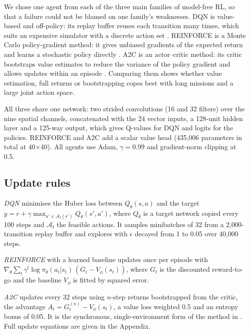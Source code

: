 We chose one agent from each of the three main families of model-free RL, so that a failure
could not be blamed on one family's weaknesses. DQN is value-based and off-policy: its replay
buffer reuses each transition many times, which suits an expensive simulator with a discrete
action set \cite{mnih2015}. REINFORCE is a Monte Carlo policy-gradient method: it gives
unbiased gradients of the expected return and learns a stochastic policy directly
\cite{williams1992}. A2C is an actor--critic method: its critic bootstraps value estimates to
reduce the variance of the policy gradient and allows updates within an episode
\cite{mnih2016}. Comparing them shows whether value estimation, full returns or bootstrapping
copes best with long missions and a large joint action space.

All three share one network: two strided convolutions (16 and 32 filters) over the nine
spatial channels, concatenated with the 24 vector inputs, a 128-unit hidden layer and a
125-way output, which gives Q-values for DQN and logits for the policies. REINFORCE and A2C
add a scalar value head (435{,}006 parameters in total at 40$\times$40). All agents use Adam,
$\gamma = 0.99$ and gradient-norm clipping at 0.5.

\subsection{Update rules}

\emph{DQN} minimises the Huber loss between $Q_\theta(s,a)$ and the target
$y = r + \gamma \max_{a' \in \mathcal{A}_{\mathrm{f}}(s')} Q_{\bar\theta}(s', a')$, where
$Q_{\bar\theta}$ is a target network copied every 100 steps and $\mathcal{A}_{\mathrm{f}}$ the
feasible actions. It samples minibatches of 32 from a 2{,}000-transition replay buffer and
explores with $\epsilon$ decayed from 1 to 0.05 over 40{,}000 steps.

\emph{REINFORCE} with a learned baseline updates once per episode with
$\nabla_\theta \sum_t \gamma^t \log \pi_\theta(a_t|s_t)\,(G_t - V_\phi(s_t))$, where $G_t$ is
the discounted reward-to-go and the baseline $V_\phi$ is fitted by squared error.

\emph{A2C} updates every 32 steps using $n$-step returns bootstrapped from the critic,
the advantage $A_t = G^{(n)}_t - V_\phi(s_t)$, a value loss weighted 0.5 and an entropy bonus
of 0.05. It is the synchronous, single-environment form of the method in \cite{mnih2016}.
Full update equations are given in the Appendix.

